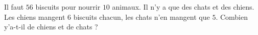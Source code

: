 
\begin{exercice}\label{exosmath-0767}

Il faut $56$ biscuits pour nourrir $10$ animaux. Il n'y a que des chats et des chiens. Les chiens mangent $6$ biscuits chacun, les chats n'en mangent que $5$. Combien y'a-t-il de chiens et de chats ?

\end{exercice}
